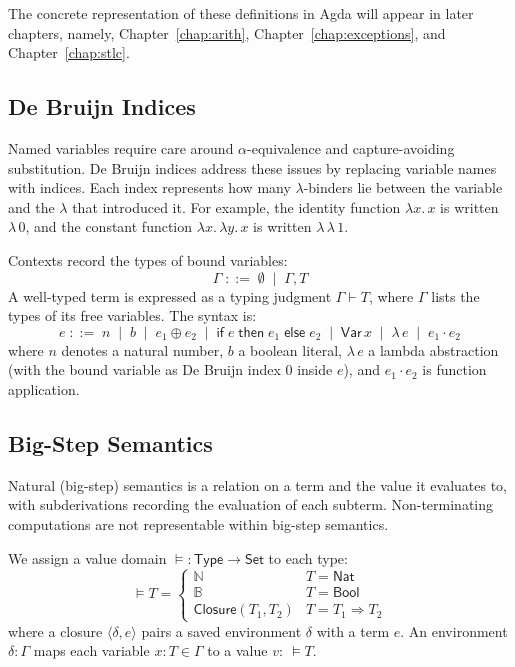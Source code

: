 The concrete representation of these definitions in Agda will appear in later chapters, namely,
Chapter~\ref{chap:arith}, Chapter~\ref{chap:exceptions}, and Chapter~\ref{chap:stlc}.

\subsection*{De Bruijn Indices}

Named variables require care around $\alpha$-equivalence and capture-avoiding substitution.
De Bruijn indices \cite{debrujin} address these issues by replacing variable names with indices. Each index represents how many $\lambda$-binders lie between the variable and the $\lambda$ that introduced it.
For example, the identity function $\lambda x.\, x$ is written $\lambda\, 0$, and the constant function $\lambda x.\, \lambda y.\, x$ is written $\lambda\, \lambda\, 1$.

Contexts record the types of bound variables:
\[
  \Gamma \;::=\; \emptyset \;\mid\; \Gamma, T
\]
A well-typed term is expressed as a typing judgment $\Gamma \vdash T$, where $\Gamma$ lists the types of its free variables.
The syntax is:
\[
  e \;::=\; {n} \;\mid\; {b} \;\mid\; e_1 \oplus e_2 \;\mid\; \mathsf{if}\;e\;\mathsf{then}\;e_1\;\mathsf{else}\;e_2 \;\mid\; \mathsf{Var}\,x \;\mid\; \lambda\,e \;\mid\; e_1 \cdot e_2
\]
where ${n}$ denotes a natural number, ${b}$ a boolean literal, $\lambda\,e$ a lambda abstraction (with the bound variable as De Bruijn index $0$ inside $e$), and $e_1 \cdot e_2$ is function application.

\subsection*{Big-Step Semantics}

Natural (big-step) semantics is a relation on a term and the value it evaluates to, with subderivations recording the evaluation of each subterm.
Non-terminating computations are not representable within big-step semantics.

We assign a value domain $\vDash : \mathsf{Type} \to \mathsf{Set}$ to each type:
\[
  \vDash T =
  \begin{cases}
    \mathbb{N}                    & T = \mathsf{Nat} \\
    \mathbb{B}                    & T = \mathsf{Bool} \\
    \mathsf{Closure}(T_1, T_2)   & T = T_1 \Rightarrow T_2
  \end{cases}
\]
where a closure $\langle \delta, e \rangle$ pairs a saved environment $\delta$ with a term $e$.
An environment $\delta : \Gamma$ maps each variable $x : T \in \Gamma$ to a value $v : \ \vDash T$.


